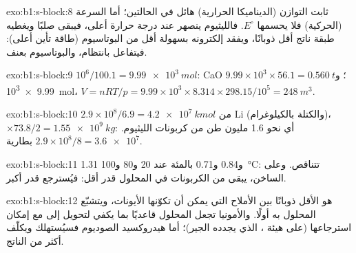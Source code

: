 \begin{solution}{exo:b1:s-block:8}
ثابت التوازن (الديناميكا الحرارية) هائل في الحالتين؛ أما السرعة
(الحركية) فلا يحسمها $E^\circ$. فالليثيوم ينصهر عند درجة حرارة
أعلى، فيبقى صلبًا ويغطيه طبقة ناتج أقل ذوبانًا،
ويفقد إلكترونه بسهولة أقل من البوتاسيوم (طاقة تأين
أعلى): فيتفاعل بانتظام، والبوتاسيوم بعنف.
\end{solution}

\begin{solution}{exo:b1:s-block:9}
$10^6/100.1 = \qty{9.99e3}{mol}$: CaO $9.99 \times 10^3 \times 56.1 =
\qty{0.560}{t}$؛ و \qty{9.99e3}{mol}، $V = nRT/p = 9.99 \times 10^3
\times 8.314 \times 298.15/10^5 = \qty{248}{m^3}$.
\end{solution}

\begin{solution}{exo:b1:s-block:10}
$2.9 \times 10^8/6.9 = \qty{4.2e7}{kmol}$ من Li (والكتلة بالكيلوغرام)، $\times 73.8/2 =
\qty{1.55e9}{kg}$: أي نحو 1.6 مليون طن من كربونات الليثيوم.
$2.9 \times 10^8/8 = \num{3.6e7}$ بطارية.
\end{solution}

\begin{solution}{exo:b1:s-block:11}
1.31 و0.84 و0.71 بالمئة عند 20 و80 و\qty{100}{\celsius}: 
تتناقص. وعلى الساخن، يبقى من الكربونات في المحلول قدر أقل: فيُسترجع قدر أكبر.
\end{solution}

\begin{solution}{exo:b1:s-block:12}
 هو الأقل ذوبانًا بين الأملاح التي يمكن أن تكوّنها الأيونات،
ويتشبّع المحلول به أولًا. والأمونيا تجعل المحلول قاعديًا
بما يكفي لتحويل  إلى  مع إمكان استرجاعها (على هيئة
، الذي يجدده الجير)؛ أما هيدروكسيد الصوديوم فسيُستهلك
ويكلّف أكثر من الناتج.
\end{solution}

